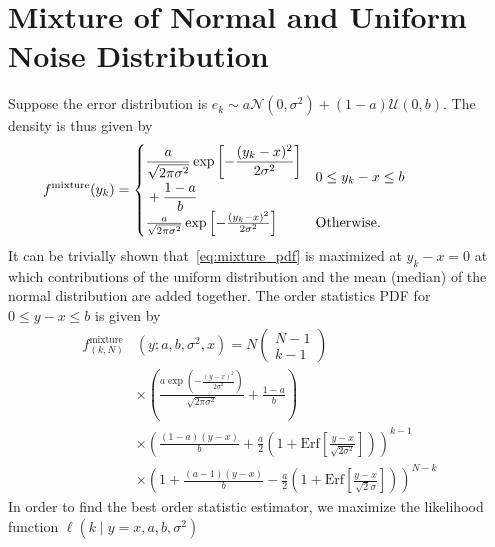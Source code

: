 \documentclass[journal]{IEEEtran}
\begin{document}
\section{Mixture of Normal and Uniform Noise Distribution} 
Suppose the error distribution is  $e_k\sim a\mathcal{N}(0,\sigma^2) + (1-a) \mathcal{U}(0,b)$. The density is thus given by
%
%
\begin{equation}\label{eq:mixture_pdf}
f^{\mathrm{mixture}}(y_k) =
\begin{cases}
\begin{aligned}
& \frac{a}{\sqrt{2\pi\sigma^2}}\exp\left[-\frac{(y_k-x)^2}{2\sigma^2}\right] \\ &+\frac{1-a}{b}		\end{aligned} & \parbox[t]{4cm}{\raggedright $0\leq y_k-x\leq b$}\\
\frac{a}{\sqrt{2\pi\sigma^2}}\exp\left[-\frac{(y_k-x)^2}{2\sigma^2}\right] & \parbox[t]{4cm}{\raggedright Otherwise.}\\
\end{cases} 
\end{equation}
%
%
It can be trivially shown that~\eqref{eq:mixture_pdf} is maximized at $y_k-x=0$ at which contributions of the uniform distribution and the mean (median) of the normal distribution are added together. The order statistics PDF for $0\leq y-x\leq b$ is given by
%
%
\begin{align}
f_{(k,N)}^{\mathrm{mixture}}&(y;a,b,\sigma^2,x) = N\begin{pmatrix}N-1\\k-1\end{pmatrix}\nonumber\\&\times\left(\frac{a\exp(-\frac{(y-x)^2}{2\sigma^2})}{\sqrt{2\pi\sigma^2}}+\frac{1-a}{b}\right)\nonumber\\
&\times\left(\frac{(1-a)(y-x)}{b}+\frac{a}{2}(1+\mathrm{Erf}\left[\frac{y-x}{\sqrt{2\sigma^2}}\right])\right)^{k-1}\nonumber\\
&\times\left(1+\frac{(a-1)(y-x)}{b}-\frac{a}{2}(1+\mathrm{Erf}\left[\frac{y-x}{\sqrt{2}\sigma}\right])\right)^{N-k}
\end{align}
%
%
In order to find the best order statistic estimator, we maximize the likelihood function $\ell(k\mid y=x,a,b,\sigma^2)$
%
%
\end{document}

